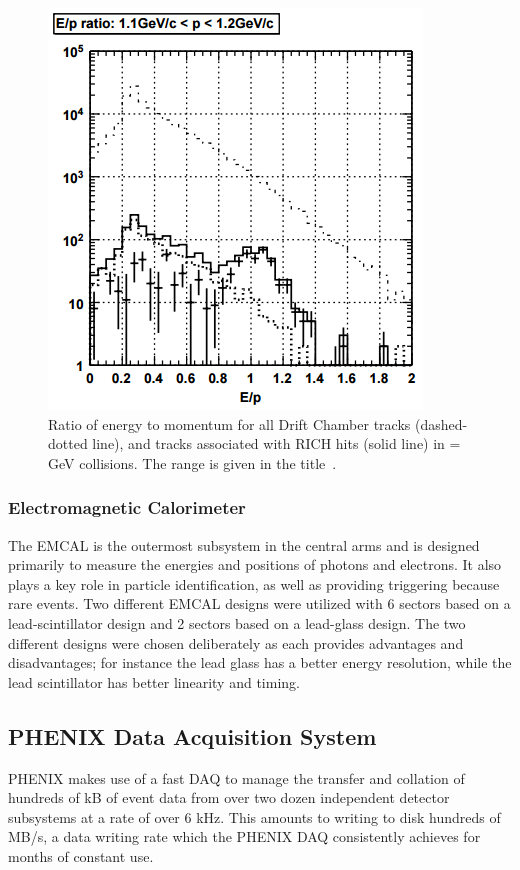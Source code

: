 \begin{figure}[!h]
\begin{center}
\includegraphics[width=0.55\linewidth]{figs/e_over_p_rich_discrimination.png}
\caption{Ratio of energy to momentum for all Drift Chamber tracks (dashed-dotted line), and tracks associated with RICH hits (solid line) in \auau =  GeV collisions. The \pt range is given in the title~\cite{Aizawa2003508}.}
\label{fig:rich_discrim_ep}
\end{center}
\end{figure}
\subsubsection{Electromagnetic Calorimeter}
The EMCAL is the outermost subsystem in the central arms and is designed primarily to measure the energies and positions of photons and electrons. It also plays a key role in particle identification, as well as providing triggering because rare events. Two different EMCAL designs were utilized with 6 sectors based on a lead-scintillator design and 2 sectors based on a lead-glass design. The two different designs were chosen deliberately as each provides advantages and disadvantages; for instance the lead glass has a better energy resolution, while the lead scintillator has better linearity and timing.
\subsection{PHENIX Data Acquisition System}
\label{sec:PHENIX_DAQ}
PHENIX makes use of a fast DAQ to manage the transfer and collation of hundreds of kB of event data from over two dozen independent detector subsystems at a rate of over 6 kHz. This amounts to writing to disk hundreds of MB/s, a data writing rate which the PHENIX DAQ consistently achieves for months of constant use. 

